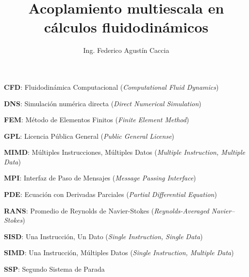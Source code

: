 \documentclass[12pt,screen,twoside,pagebackref]{ibtesis}
\title{Acoplamiento multiescala en cálculos fluidodinámicos}
\author{Ing. Federico Agustín Caccia}
\begin{document}
\renewcommand{\tablename}{Tabla} %


\begin{preliminary}



\begin{abreviaturas} %

\textbf{CFD}: Fluidodinámica Computacional (\textit{Computational Fluid Dynamics})

\textbf{DNS}: Simulación numérica directa (\textit{Direct Numerical Simulation})

\textbf{FEM}: Método de Elementos Finitos (\textit{Finite Element Method})

\textbf{GPL}: Licencia Pública General (\textit{Public General License})

\textbf{MIMD}: Múltiples Instrucciones, Múltiples Datos (\textit{Multiple Instruction, Multiple Data})

\textbf{MPI}: Interfaz de Paso de Mensajes (\textit{Message Passing Interface})

\textbf{PDE}: Ecuación con Derivadas Parciales (\textit{Partial Differential Equation})

\textbf{RANS}: Promedio de Reynolds de Navier-Stokes (\textit{Reynolds-Averaged Navier–Stokes})

\textbf{SISD}: Una Instrucción, Un Dato (\textit{Single Instruction, Single Data})

\textbf{SIMD}: Una Instrucción, Múltiples Datos (\textit{Single Instruction, Multiple Data})

\textbf{SSP}: Segundo Sistema de Parada

\end{abreviaturas}

\tableofcontents                %

\listoffigures                  %

\listoftables                   %



\end{preliminary}


\end{document}

